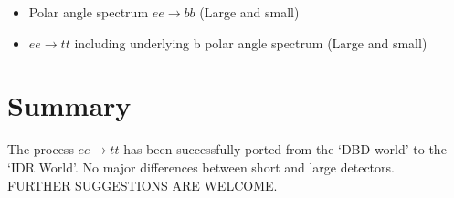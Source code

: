 \documentclass[preprint]{elsarticle}
\newcommand{\qgsp}{{\sc qgsp\_bert}}
\newcommand{\ftfp}{{\sc ftfp\_bert}}
\newcommand{\qbbc}{{\sc qbbc}}
\begin{document}
\begin{itemize}
\item Polar angle spectrum $ee\rightarrow bb$ (Large and small)
\item $ee\rightarrow tt$  including underlying b polar angle spectrum (Large and small)
\end{itemize}







\section{Summary}

The process $ee\rightarrow tt$ has been successfully ported from the `DBD world' to the `IDR World'. No major differences between short and large detectors. \\

FURTHER SUGGESTIONS ARE WELCOME.
\end{document}
